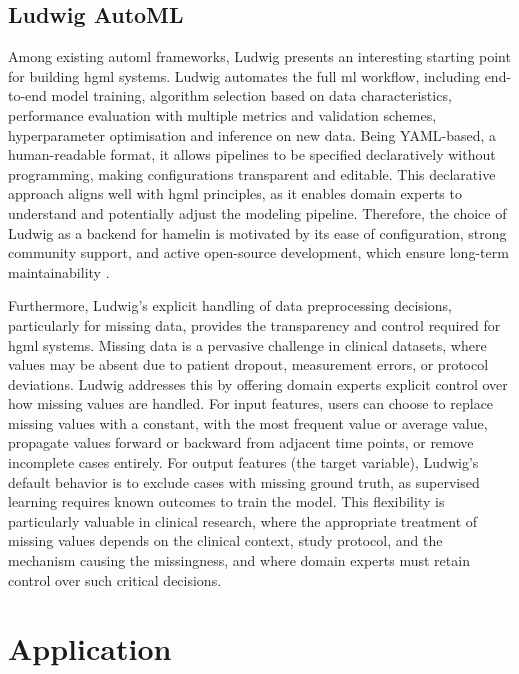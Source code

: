 \documentclass[conference,onecolumn]{IEEEtran}
\begin{document}
\subsection{Ludwig AutoML}
\label{subsec:ludwig}
  
Among existing \gls{automl} frameworks, Ludwig \cite{ludwig} presents an interesting starting point for building \gls{hgml} systems. Ludwig automates the full \gls{ml} workflow, including end-to-end model training, algorithm selection based on data characteristics, performance evaluation with multiple metrics and validation schemes, hyperparameter optimisation and inference on new data. Being YAML-based, a human-readable format, it allows pipelines to be specified declaratively without programming, making configurations transparent and editable. This declarative approach aligns well with \gls{hgml} principles, as it enables domain experts to understand and potentially adjust the modeling pipeline. Therefore, the choice of Ludwig as a backend for \gls{hamelin} is motivated by its ease of configuration, strong community support, and active open-source development, which ensure long-term maintainability \cite{palazuelos2024non}.  
  
Furthermore, Ludwig's explicit handling of data preprocessing decisions, particularly for missing data, provides the transparency and control required for \gls{hgml} systems. Missing data is a pervasive challenge in clinical datasets, where values may be absent due to patient dropout, measurement errors, or protocol deviations. Ludwig addresses this by offering domain experts explicit control over how missing values are handled. For input features, users can choose to replace missing values with a constant, with the most frequent value or average value, propagate values forward or backward from adjacent time points, or remove incomplete cases entirely. For output features (the target variable), Ludwig's default behavior is to exclude cases with missing ground truth, as supervised learning requires known outcomes to train the model. This flexibility is particularly valuable in clinical research, where the appropriate treatment of missing values depends on the clinical context, study protocol, and the mechanism causing the missingness, and where domain experts must retain control over such critical decisions.

\section{Application}  
\label{sec:application}
\end{document}
